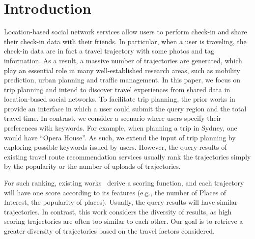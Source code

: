 \section{Introduction}
Location-based social network services allow users to perform check-in and share their check-in data with their friends. In particular, when a user is traveling, the check-in data are in fact a travel trajectory with some photos and tag information. As a result, a massive number of trajectories are generated, which play an essential role in many well-established research areas, such as mobility prediction, urban planning and traffic management. In this paper, we focus on trip planning and intend to discover travel experiences from shared data in location-based social networks. To facilitate trip planning, the prior works in \cite{SIGMOD2010}\cite{hsieh2014mining}\cite{ICPADS2007}\cite{skyline2014}\cite{WWW2009} provide an interface in which a user could submit the query region and the total travel time. In contrast, we consider a scenario where users specify their preferences with keywords. For example, when planning a trip in Sydney, one would have ``Opera House''. As such, we extend the input of trip planning by exploring possible keywords issued by users. However, the query results of existing travel route recommendation services usually rank the trajectories simply by the popularity or the number of uploads of trajectories. 

For such ranking, existing works~\cite{yuan2014graph}\cite{ye2011exploiting}\cite{ytwen2014} derive a scoring function, and each trajectory will have one score according to its features (e.g., the number of Places of Interest, the popularity of places). Usually, the query results will have similar trajectories. In contrast, this work considers the diversity of results, as high scoring trajectories are often too similar to each other. Our goal is to retrieve a greater diversity of trajectories based on the travel factors considered.


